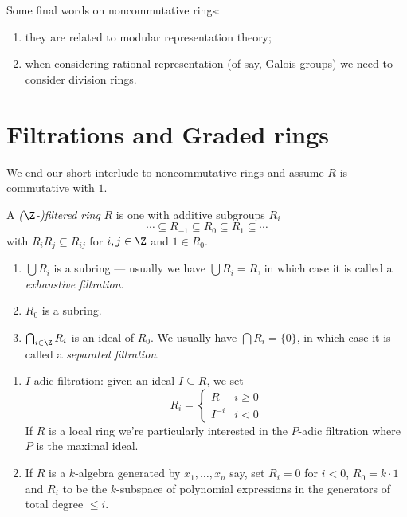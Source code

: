 \documentclass[a4paper]{article}
\begin{document}
Some final words on noncommutative rings:
\begin{enumerate}
\item they are related to modular representation theory;
\item when considering rational representation (of say, Galois groups) we need to consider division rings.
\end{enumerate}

\section{Filtrations and Graded rings}

We end our short interlude to noncommutative rings and assume \(R\) is commutative with \(1\).

\begin{definition}
  A \emph{(\(\Z\)-)filtered ring} \(R\) is one with additive subgroups \(R_i\)
  \[
    \cdots \subseteq R_{-1} \subseteq R_0 \subseteq R_1 \subseteq \cdots
  \]
  with \(R_i R_j \subseteq R_{ij}\) for  \(i, j \in \Z\) and \(1 \in R_0\).
\end{definition}

\begin{note}\leavevmode
  \begin{enumerate}
  \item \(\bigcup R_i\) is a subring --- usually we have \(\bigcup R_i = R\), in which case it is called a \emph{exhaustive filtration}.
  \item \(R_0\) is a subring.
  \item \(\bigcap_{i \in \Z} R_i\) is an ideal of \(R_0\). We usually have \(\bigcap R_i = \{0\}\), in which case it is called a \emph{separated filtration}.
  \end{enumerate}
\end{note}

\begin{eg}\leavevmode
  \begin{enumerate}
  \item \(I\)-adic filtration: given an ideal \(I \subseteq R\), we set
    \[
      R_i =
      \begin{cases}
        R & i \geq 0 \\
        I^{-i} & i < 0
      \end{cases}
    \]
    If \(R\) is a local ring we're particularly interested in the \(P\)-adic filtration where \(P\) is the maximal ideal.
  \item If \(R\) is a \(k\)-algebra generated by \(x_1, \dots, x_n\) say, set \(R_i = 0\) for \(i < 0\), \(R_0 = k \cdot 1\) and \(R_i\) to be the \(k\)-subspace of polynomial expressions in the generators of total degree \(\leq i\).
  \end{enumerate}
\end{eg}
\end{document}
